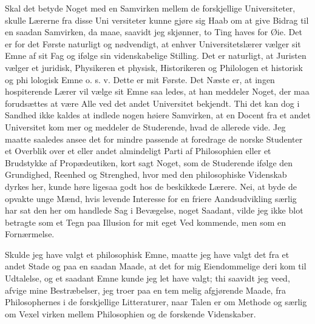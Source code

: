 \documentclass[12pt]{book}
\newcommand{\opage}[1]{\marginnote{\footnotesize\textit{[#1]}}}
\begin{document}
Skal det betyde Noget med en Samvirken mellem
de forskjellige Universiteter, skulle Lærerne fra disse Uni\-%
versiteter kunne gjøre sig Haab om at give Bidrag til
en saadan Samvirken, da maae, saavidt jeg skjønner, to
Ting haves for Øie. Det er for det Første naturligt og
nødvendigt, at enhver Universitetslærer vælger sit Emne
af sit Fag og ifølge sin videnskabelige Stilling. Det er
naturligt, at Juristen vælger et juridisk, Physikeren et
physisk, Historikeren og Philologen et historisk og phi\-%
lologisk Emne o. s. v. Dette er mit Første. Det Næste
er, at ingen hospiterende Lærer vil vælge sit Emne saa\-%
\opage{280}\setcounter{footnote}{0}%
ledes, at han meddeler Noget, der maa forudsættes at
være Alle ved det andet Universitet bekjendt. Thi det
kan dog i Sandhed ikke kaldes at indlede nogen høiere
Samvirken, at en Docent fra et andet Universitet kom\-%
mer og meddeler de Studerende, hvad de allerede
vide. Jeg maatte saaledes ansee det for mindre passende
at foredrage de norske Studenter et Overblik over et eller
andet almindeligt Parti af Philosophien eller et Brudstykke
af Propædeutiken, kort sagt Noget, som de Studerende
ifølge den Grundighed, Reenhed og Strenghed, hvor\-%
med den philosophiske Videnskab dyrkes her, kunde
høre ligesaa godt hos de beskikkede Lærere. Nei, at
byde de opvakte unge Mænd, hvis levende Interesse
for en friere Aandsudvikling særlig har sat den her om\-%
handlede Sag i Bevægelse, noget Saadant, vilde jeg ikke
blot betragte som et Tegn paa Illusion for mit eget Ved\-%
kommende, men som en Fornærmelse.

Skulde jeg have valgt et philosophisk Emne, maatte
jeg have valgt det fra et andet Stade og paa en saadan
Maade, at det for mig Eiendommelige deri kom til Udtalelse,
og et saadant Emne kunde jeg let have valgt; thi saavidt
jeg veed, afvige mine Bestræbelser, jeg troer paa en tem\-%
melig afgjørende Maade, fra Philosophernes i de forskjellige
Litteraturer, naar Talen er om Methode og særlig om Vexel\-%
virken mellem Philosophien og de forskende Videnskaber.
\end{document}
